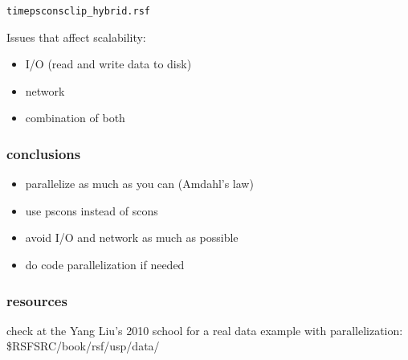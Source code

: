 \begin{frame}[fragile]

   \begin{alltt}
   time pscons clip_hybrid.rsf
   \end{alltt}
\end{frame}


\begin{frame} 
Issues that affect scalability: \\
\begin{itemize}
\item I/O (read and write data to disk)
\pause
\item network 
\pause
\item combination of both
\end {itemize}
\end{frame}



\begin{frame}\frametitle{conclusions}
\begin {itemize}
    \item parallelize as much as you can (Amdahl's law)
    \item use pscons instead of scons
    \item avoid I/O and network as much as possible
    \item do code parallelization if needed
\end {itemize}
\end{frame}

\begin{frame}\frametitle{resources}
\vfill
{}
\vfill
{}
\vfill
\end{frame}

\begin{frame}
\end{frame}

\begin{frame}
check at the Yang Liu's 2010 school for a real data example with parallelization:\\ 
\$RSFSRC/book/rsf/usp/data/
\end{frame}



